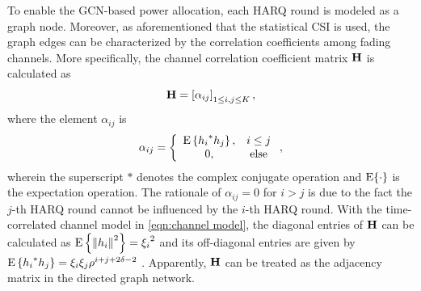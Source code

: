 \documentclass[conference]{IEEEtran}
\begin{document}
To enable the GCN-based power allocation, each HARQ round is modeled as a graph node. Moreover, as aforementioned that the statistical CSI is used, the graph edges can be characterized by the correlation coefficients among fading channels. More specifically, the channel correlation coefficient matrix ${\bf H}$ is calculated as
\begin{equation}\label{eqn:H_def_co}
    {\bf H} = %
    \left[  {\alpha}_{ij} \right]_{1 \le i,j\le K},
\end{equation}
where the element ${\alpha _{ij}} $ is
\begin{equation}
    {\alpha _{ij}} = \left\{ {\begin{array}{*{20}{c}}
{{\rm{E}}\left\{ {{h_i}^{*}{h_j}} \right\},}&{i \le j}\\
{0,}&{\rm else}
\end{array}} \right.,
\end{equation}
wherein the superscript ${*}$ denotes the complex conjugate operation and $\rm E\{\cdot\}$ is the expectation operation. The rationale of ${\alpha _{ij}}=0$ for $i>j$ is due to the fact the $j$-th HARQ round cannot be influenced by the $i$-th HARQ round. With the time-correlated channel model in \eqref{eqn:channel model}, the diagonal entries of ${\bf H}$ can be calculated as ${\rm{E}}\left\{ {{{\left\| {{h_i}} \right\|}^2}} \right\} = {\xi _i}^2$ and its off-diagonal entries are given by ${\rm{E}}\left\{ {{h_i}^{*}{h_j}} \right\} = {\xi _i}{\xi _j}{\rho ^{i + j + 2\delta  - 2}}$ \cite{6094281}. %
Apparently, ${\bf H}$ can be treated as the adjacency matrix in the directed graph network.
\end{document}
